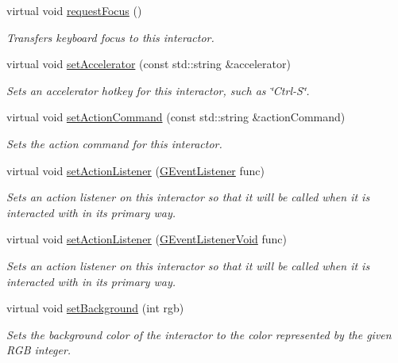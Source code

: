 \begin{DoxyCompactItemize}
virtual void \mbox{\hyperlink{classsgl_1_1GInteractor_a519fb2ac767f8b2febbb50b898b8c8cb}{request\+Focus}} ()
\begin{DoxyCompactList}\small\item\em Transfers keyboard focus to this interactor. \end{DoxyCompactList}\item 
virtual void \mbox{\hyperlink{classsgl_1_1GInteractor_ad15f102f62e2960576012f1aa0ba4b2e}{set\+Accelerator}} (const std\+::string \&accelerator)
\begin{DoxyCompactList}\small\item\em Sets an accelerator hotkey for this interactor, such as \char`\"{}\+Ctrl-\/\+S\char`\"{}. \end{DoxyCompactList}\item 
virtual void \mbox{\hyperlink{classsgl_1_1GInteractor_a4b5843fe3030e038a1ba54cc03389bcf}{set\+Action\+Command}} (const std\+::string \&action\+Command)
\begin{DoxyCompactList}\small\item\em Sets the action command for this interactor. \end{DoxyCompactList}\item 
virtual void \mbox{\hyperlink{classsgl_1_1GInteractor_adcfb4742430c88714fcf57e57ab8ea9c}{set\+Action\+Listener}} (\mbox{\hyperlink{namespacesgl_ae9f3e9eab70035da1a2b114e21357b25}{G\+Event\+Listener}} func)
\begin{DoxyCompactList}\small\item\em Sets an action listener on this interactor so that it will be called when it is interacted with in its primary way. \end{DoxyCompactList}\item 
virtual void \mbox{\hyperlink{classsgl_1_1GInteractor_aebd20a89c7a8a43a6fce999cf4f9fcf2}{set\+Action\+Listener}} (\mbox{\hyperlink{namespacesgl_a54427ce97bb1c2804e4fe2b0a62e8b17}{G\+Event\+Listener\+Void}} func)
\begin{DoxyCompactList}\small\item\em Sets an action listener on this interactor so that it will be called when it is interacted with in its primary way. \end{DoxyCompactList}\item 
virtual void \mbox{\hyperlink{classsgl_1_1GInteractor_acba7e546c2025c0a15ca4b4cc92043db}{set\+Background}} (int rgb)
\begin{DoxyCompactList}\small\item\em Sets the background color of the interactor to the color represented by the given R\+GB integer. \end{DoxyCompactList}\item 

\end{DoxyCompactItemize}
